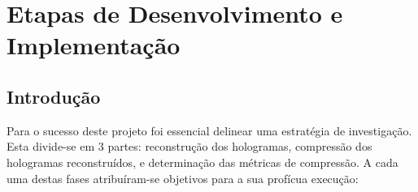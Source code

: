 \chapter{Etapas de Desenvolvimento e Implementação}
\label{ch::imp-test}

\section{Introdução}
\label{sec::imp-test:intro}

Para o sucesso deste projeto foi essencial delinear uma estratégia de investigação. Esta divide-se em 3 partes: reconstrução dos hologramas, compressão dos hologramas reconstruídos, e determinação das métricas de compressão. A cada uma destas fases atribuíram-se objetivos para a sua profícua execução:

